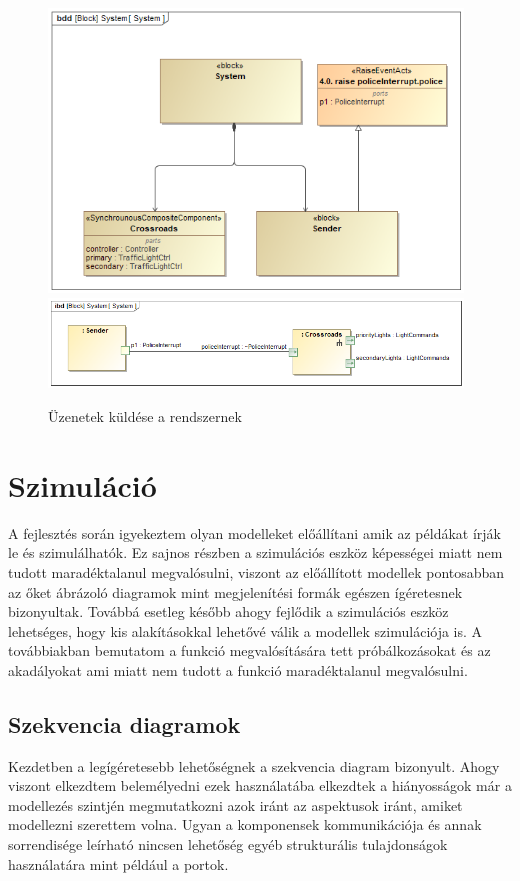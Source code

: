 \begin{figure}[!ht]
	\centering
	\includegraphics[width=110mm, keepaspectratio]{figures/contribution/trace1.png}
	\includegraphics[width=110mm, keepaspectratio]{figures/contribution/trace2.png}
	\caption{Üzenetek küldése a rendszernek}
	\label{fig:trace-signals}
\end{figure}


\newpage\section{Szimuláció}

A fejlesztés során igyekeztem olyan modelleket előállítani amik az példákat írják le és szimulálhatók. Ez sajnos részben a szimulációs eszköz képességei miatt nem tudott maradéktalanul megvalósulni, viszont az előállított modellek pontosabban az őket ábrázoló diagramok mint megjelenítési formák egészen ígéretesnek bizonyultak. Továbbá esetleg később ahogy fejlődik a szimulációs eszköz lehetséges, hogy kis alakításokkal lehetővé válik a modellek szimulációja is. A továbbiakban bemutatom a funkció megvalósítására tett próbálkozásokat és az akadályokat ami miatt nem tudott a funkció maradéktalanul megvalósulni.

\subsection{Szekvencia diagramok}

Kezdetben a legígéretesebb lehetőségnek a szekvencia diagram bizonyult. Ahogy viszont elkezdtem belemélyedni ezek használatába elkezdtek a hiányosságok már a modellezés szintjén megmutatkozni azok iránt az aspektusok iránt, amiket modellezni szerettem volna. Ugyan a komponensek kommunikációja és annak sorrendisége leírható nincsen lehetőség egyéb strukturális tulajdonságok használatára mint például a portok.

